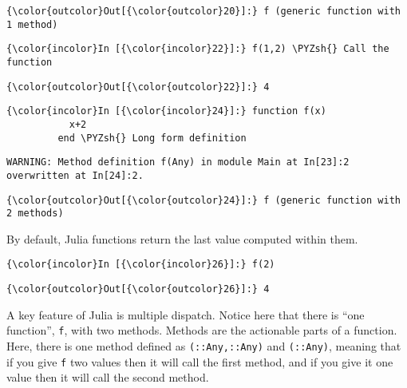 \documentclass[11pt]{article}
\def\PYZsh{\char`\#}
\begin{document}
            \begin{Verbatim}[commandchars=\\\{\}]
{\color{outcolor}Out[{\color{outcolor}20}]:} f (generic function with 1 method)
\end{Verbatim}
        
    \begin{Verbatim}[commandchars=\\\{\}]
{\color{incolor}In [{\color{incolor}22}]:} f(1,2) \PYZsh{} Call the function
\end{Verbatim}

            \begin{Verbatim}[commandchars=\\\{\}]
{\color{outcolor}Out[{\color{outcolor}22}]:} 4
\end{Verbatim}
        
    \begin{Verbatim}[commandchars=\\\{\}]
{\color{incolor}In [{\color{incolor}24}]:} function f(x)
           x+2  
         end \PYZsh{} Long form definition
\end{Verbatim}

    \begin{Verbatim}[commandchars=\\\{\}]
WARNING: Method definition f(Any) in module Main at In[23]:2 overwritten at In[24]:2.

    \end{Verbatim}

            \begin{Verbatim}[commandchars=\\\{\}]
{\color{outcolor}Out[{\color{outcolor}24}]:} f (generic function with 2 methods)
\end{Verbatim}
        
    By default, Julia functions return the last value computed within them.

    \begin{Verbatim}[commandchars=\\\{\}]
{\color{incolor}In [{\color{incolor}26}]:} f(2)
\end{Verbatim}

            \begin{Verbatim}[commandchars=\\\{\}]
{\color{outcolor}Out[{\color{outcolor}26}]:} 4
\end{Verbatim}
        
    A key feature of Julia is multiple dispatch. Notice here that there is
``one function'', \texttt{f}, with two methods. Methods are the
actionable parts of a function. Here, there is one method defined as
\texttt{(::Any,::Any)} and \texttt{(::Any)}, meaning that if you give
\texttt{f} two values then it will call the first method, and if you
give it one value then it will call the second method.
\end{document}
